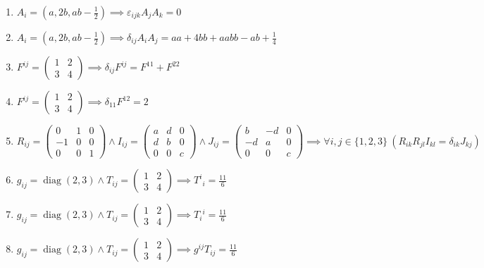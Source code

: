 \documentclass[11pt,a4paper]{article}
\begin{document}
\begin{enumerate}
\item $\displaystyle A_{i} = (a, 2 b, a b - \frac{1}{2}) \implies \varepsilon_{ijk} A_{j} A_{k} = 0$
\item $\displaystyle A_{i} = (a, 2 b, a b - \frac{1}{2}) \implies \delta_{ij} A_{i} A_{j} = a a + 4 b b + a a b b - a b + \frac{1}{4}$
\item $\displaystyle F^{ij} = \begin{pmatrix} 1 & 2 \\ 3 & 4 \end{pmatrix} \implies \delta_{ij} F^{ij} = F^{11} + F^{22}$
\item $\displaystyle F^{ij} = \begin{pmatrix} 1 & 2 \\ 3 & 4 \end{pmatrix} \implies \delta_{11} F^{12} = 2$
\item $\displaystyle R_{ij} = \begin{pmatrix} 0 & 1 & 0 \\ -1 & 0 & 0 \\ 0 & 0 & 1 \end{pmatrix} \land I_{ij} = \begin{pmatrix} a & d & 0 \\ d & b & 0 \\ 0 & 0 & c \end{pmatrix} \land J_{ij} = \begin{pmatrix} b & -d & 0 \\ -d & a & 0 \\ 0 & 0 & c \end{pmatrix} \implies \forall i, j \in \{1, 2, 3\}\ \left( R_{ik} R_{jl} I_{kl} = \delta_{ik} J_{kj} \right)$
\item $\displaystyle g_{ij} = \operatorname{diag}(2, 3) \land T_{ij} = \begin{pmatrix} 1 & 2 \\ 3 & 4 \end{pmatrix} \implies T^{i}{}_{i} = \frac{11}{6}$
\item $\displaystyle g_{ij} = \operatorname{diag}(2, 3) \land T_{ij} = \begin{pmatrix} 1 & 2 \\ 3 & 4 \end{pmatrix} \implies T_{i}{}^{i} = \frac{11}{6}$
\item $\displaystyle g_{ij} = \operatorname{diag}(2, 3) \land T_{ij} = \begin{pmatrix} 1 & 2 \\ 3 & 4 \end{pmatrix} \implies g^{ij} T_{ij} = \frac{11}{6}$

\end{enumerate}
\end{document}
